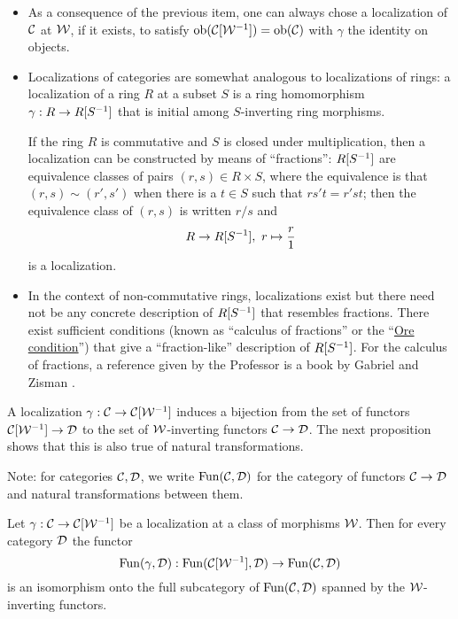 \begin{itemize}[label={-}]
    \item As a consequence of the previous item, one can always chose a localization of $\mathcal{C}$ at $\mathcal{W}$, if it exists, to satisfy $\operatorname{ob}(\mathcal{C}[\mathcal{W}^{-1}])=\operatorname{ob}(\mathcal{C})$ with $\gamma$ the identity on objects.
    
    \item Localizations of categories are somewhat analogous to localizations of rings: a localization of a ring $R$ at a subset $S$ is a ring homomorphism $\gamma:R\to R[S^{-1}]$ that is initial among $S$-inverting ring morphisms.
    
    If the ring $R$ is commutative and $S$ is closed under multiplication, then a localization can be constructed by means of \enquote{fractions}: $R[S^{-1}]$ are equivalence classes of pairs $(r,s)\in R\times S$, where the equivalence is that $(r,s)\sim(r',s')$ when there is a $t\in S$ such that $rs't=r'st$; then the equivalence class of $(r,s)$ is written $r/s$ and
    \[R\to R[S^{-1}],\ r\mapsto \frac{r}{1}\]
    is a localization.
    
    \item In the context of non-commutative rings, localizations exist but there need not be any concrete description of $R[S^{-1}]$ that resembles fractions. There exist sufficient conditions (known as \enquote{calculus of fractions} or the \enquote{\href{https://en.wikipedia.org/wiki/Ore_condition}{Ore condition}}) that give a \enquote{fraction-like} description of $R[S^{-1}]$. For the calculus of fractions, a reference given by the Professor is a book by Gabriel and Zisman \cite{gabriel-zisman}.
\end{itemize}

A localization $\gamma:\mathcal{C}\to\mathcal{C}[\mathcal{W}^{-1}]$ induces a bijection from the set of functors $\mathcal{C}[\mathcal{W}^{-1}]\to \mathcal{D}$ to the set of $\mathcal{W}$-inverting functors $\mathcal{C}\to\mathcal{D}$. The next proposition shows that this is also true of natural transformations.

Note: for categories $\mathcal{C},\mathcal{D}$, we write $\operatorname{Fun}(\mathcal{C},\mathcal{D})$ for the category of functors $\mathcal{C}\to\mathcal{D}$ and natural transformations between them.

\begin{proposition}\label{proposition:localization-induces-embedding}
Let $\gamma:\mathcal{C}\to\mathcal{C}[\mathcal{W}^{-1}]$ be a localization at a class of morphisms $\mathcal{W}$. Then for every category $\mathcal{D}$ the functor
\[\operatorname{Fun}(\gamma,\mathcal{D}):\operatorname{Fun}(\mathcal{C}[\mathcal{W}^{-1}],\mathcal{D})\to\operatorname{Fun}(\mathcal{C},\mathcal{D})\]
is an isomorphism onto the full subcategory of $\operatorname{Fun}(\mathcal{C},\mathcal{D})$ spanned by the $\mathcal{W}$-inverting functors.
\end{proposition}

